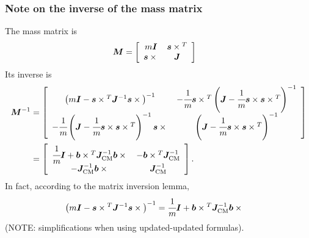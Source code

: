 \documentclass[10pt,dvips,fleqn,subeqn]{report}
\newcommand{\T}[1]{\bm{#1}}
\newcommand{\TT}[1]{\bm{#1}}
\begin{document}
\subsubsection{Note on the inverse of the mass matrix}
The mass matrix is
\begin{align}
	\TT{M}
	&=
	\sqbr{\matr{cc}{
		m \TT{I} & \T{s}\times{}^T
		\\
		\T{s}\times{} & \TT{J}
	}}
\end{align}
Its inverse is
\begin{align}
	\TT{M}^{-1}
	&=
	\sqbr{\matr{cc}{
		\plbr{
			m \TT{I}
			-
			\T{s}\times{}^T \TT{J}^{-1} \TT{s}\times{}
		}^{-1}
		&
		-\cfrac{1}{m}\T{s}\times{}^T \plbr{
			\TT{J}
			-
			\cfrac{1}{m} \T{s}\times \T{s} \times{}^T
		}^{-1}
		\\
		-\cfrac{1}{m} \plbr{
			\TT{J}
			-
			\cfrac{1}{m} \T{s}\times \T{s} \times{}^T
		}^{-1} \T{s}\times{}
		&
		\plbr{
			\TT{J}
			-
			\cfrac{1}{m} \T{s}\times \T{s}\times{}^T
		}^{-1}
	}}
	\nonumber \\
	&=
	\sqbr{\matr{cc}{
		\cfrac{1}{m} \TT{I}
		+
		\T{b}\times{}^T \TT{J}_\text{CM}^{-1} \T{b}\times{}
		&
		-\T{b}\times{}^T \TT{J}_\text{CM}^{-1}
		\\
		- \TT{J}_\text{CM}^{-1}\T{b}\times{}
		&
		\TT{J}_\text{CM}^{-1}
	}}
	.
\end{align}
In fact, according to the matrix inversion lemma,
\begin{align}
	\plbr{
		m \TT{I}
		-
		\T{s} \times{}^T \TT{J}^{-1} \T{s}\times{}
	}^{-1}
	&=
	\cfrac{1}{m} \TT{I}
	+
	\T{b}\times{}^T \TT{J}_\text{CM}^{-1} \T{b}\times{}
\end{align}
(NOTE: simplifications when using updated-updated formulas).
\end{document}
